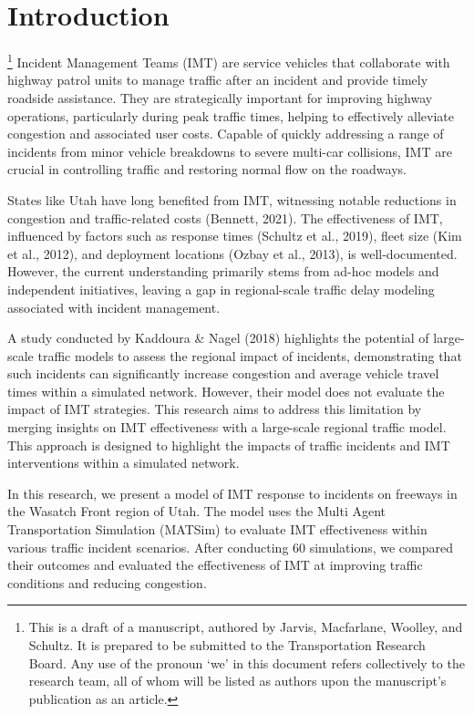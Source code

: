 \documentclass[fancy, oneside, mastersfancy, ms]{byuthesis}
\begin{document}
\hypertarget{introduction}{%
\chapter{Introduction}\label{introduction}}

\footnote{This is a draft of a manuscript, authored by Jarvis,
  Macfarlane, Woolley, and Schultz. It is prepared to be submitted to
  the Transportation Research Board. Any use of the pronoun `we' in this
  document refers collectively to the research team, all of whom will be
  listed as authors upon the manuscript's publication as an article.}
Incident Management Teams (IMT) are service vehicles that collaborate
with highway patrol units to manage traffic after an incident and
provide timely roadside assistance. They are strategically important for
improving highway operations, particularly during peak traffic times,
helping to effectively alleviate congestion and associated user costs.
Capable of quickly addressing a range of incidents from minor vehicle
breakdowns to severe multi-car collisions, IMT are crucial in
controlling traffic and restoring normal flow on the roadways.

States like Utah have long benefited from IMT, witnessing notable
reductions in congestion and traffic-related costs (Bennett, 2021). The
effectiveness of IMT, influenced by factors such as response times
(Schultz et al., 2019), fleet size (Kim et al., 2012), and deployment
locations (Ozbay et al., 2013), is well-documented. However, the current
understanding primarily stems from ad-hoc models and independent
initiatives, leaving a gap in regional-scale traffic delay modeling
associated with incident management.

A study conducted by Kaddoura \& Nagel (2018) highlights the potential
of large-scale traffic models to assess the regional impact of
incidents, demonstrating that such incidents can significantly increase
congestion and average vehicle travel times within a simulated network.
However, their model does not evaluate the impact of IMT strategies.
This research aims to address this limitation by merging insights on IMT
effectiveness with a large-scale regional traffic model. This approach
is designed to highlight the impacts of traffic incidents and IMT
interventions within a simulated network.

In this research, we present a model of IMT response to incidents on
freeways in the Wasatch Front region of Utah. The model uses the Multi
Agent Transportation Simulation (MATSim) to evaluate IMT effectiveness
within various traffic incident scenarios. After conducting 60
simulations, we compared their outcomes and evaluated the effectiveness
of IMT at improving traffic conditions and reducing congestion.
\end{document}
